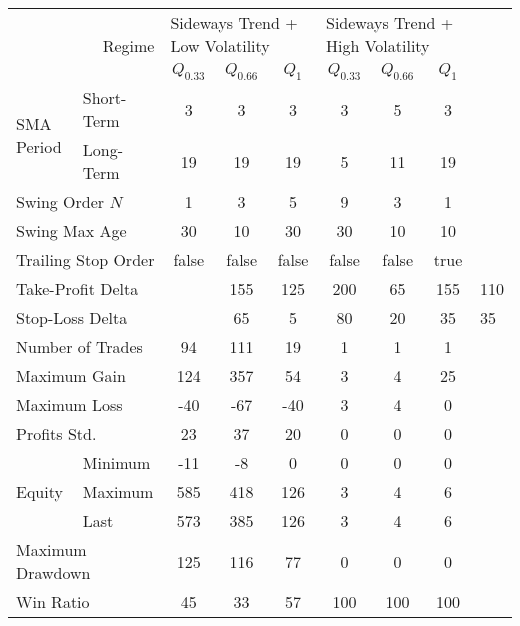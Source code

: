 \begin{tabular}{ll|cccccc}
    \toprule
    \multicolumn{2}{r|}{\multirow{2}{*}{Regime}} & \multicolumn{3}{l}{Sideways Trend + Low Volatility} & \multicolumn{3}{l}{Sideways Trend + High Volatility}  \\
    \multicolumn{2}{r|}{} & $Q_{0.33}$ & $Q_{0.66}$ & $Q_{1}$ & $Q_{0.33}$ & $Q_{0.66}$ & $Q_{1}$ \\
    \midrule
    \multirow{2}{*}{SMA Period}            & Short-Term & 3   & 3   & 3   & 3  & 5   & 3   \\
    & Long-Term  & 19  & 19  & 19  & 5  & 11  & 19  \\
    \multicolumn{2}{l|}{Swing Order $N$} & 1 & 3 & 5 & 9 & 3 & 1 \\
    \multicolumn{2}{l|}{Swing Max Age} & 30 & 10 & 30 & 30 & 10 & 10 \\
    \multicolumn{2}{l|}{Trailing Stop Order} & false & false & false & false & false & true \\
    \multicolumn{2}{l|}{Take-Profit Delta} &            & 155 & 125 & 200 & 65 & 155 & 110 \\
    \multicolumn{2}{l|}{Stop-Loss Delta}   &            & 65  & 5   & 80  & 20 & 35  & 35  \\
    \midrule
    \multicolumn{2}{l|}{Number of Trades} & 94 & 111 & 19 & 1 & 1 & 1 \\
    \multicolumn{2}{l|}{Maximum Gain} & 124 & 357 & 54 & 3 & 4 & 25 \\
    \multicolumn{2}{l|}{Maximum Loss} & -40 & -67 & -40 & 3 & 4 & 0 \\
    \multicolumn{2}{l|}{Profits Std.} & 23 & 37 & 20 & 0 & 0 & 0 \\
    \multirow{3}{*}{Equity}                & Minimum    & -11 & -8  & 0   & 0  & 0   & 0   \\
    & Maximum    & 585 & 418 & 126 & 3  & 4   & 6   \\
    & Last       & 573 & 385 & 126 & 3  & 4   & 6   \\
    \multicolumn{2}{l|}{Maximum Drawdown} & 125 & 116 & 77 & 0 & 0 & 0 \\
    \multicolumn{2}{l|}{Win Ratio} & 45 & 33 & 57 & 100 & 100 & 100 \\
    \bottomrule
\end{tabular}
